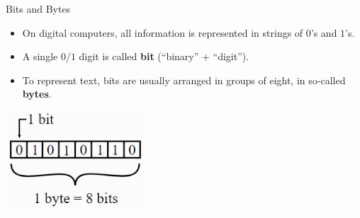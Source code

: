 















\begin{vbframe}{Bits and Bytes}
\begin{itemize}
\item On digital computers, all information is represented in strings of $0$'s and $1$'s.
\item A single $0$/$1$ digit is called \textbf{bit} (\enquote{binary} + \enquote{digit}).
\item To represent text, bits are usually arranged in groups of eight, in so-called \textbf{bytes}.
\end{itemize}

\begin{center}
\includegraphics[width=0.4\textwidth]{figure_man/bitbyte.png}
\end{center}


\end{vbframe}

